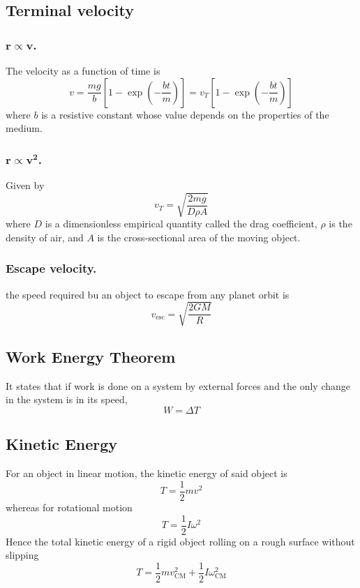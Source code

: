 \documentclass[../../../main.tex]{subfiles}
\begin{document}
\subsection*{Terminal velocity}
\subsubsection*{$\boldsymbol{r\propto v}$.} The velocity as a function of time is 
\begin{equation*}
    v=\frac{mg}{b}\left[1-\exp\left(-\frac{bt}{m}\right)\right]=v_T\left[1-\exp\left(-\frac{bt}{m}\right)\right]
\end{equation*}
where $b$ is a resistive constant whose value depends on the properties of the medium.
\subsubsection*{$\boldsymbol{r\propto v^2}$.} Given by 
\begin{equation*}
    v_T=\sqrt{\frac{2mg}{D\rho A}}
\end{equation*}
where $D$ is a dimensionless empirical quantity called the drag coefficient, $\rho$ is the density of air, and $A$ is the cross-sectional area of the moving object.

\subsubsection*{Escape velocity.} the speed required bu an object to escape from any planet orbit is 
\begin{equation*}
    v_\text{esc}=\sqrt{\frac{2GM}{R}}
\end{equation*}

\subsection*{Work Energy Theorem}
It states that if work is done on a system by external forces and
the only change in the system is in its speed,
\begin{equation*}
    W=\Delta T
\end{equation*}

\subsection*{Kinetic Energy}
For an object in linear motion, the kinetic energy of said object is 
\begin{equation*}
    T=\frac{1}{2}mv^2
\end{equation*}
whereas for rotational motion
\begin{equation*}
    T=\frac{1}{2}I\omega^2
\end{equation*}
Hence the total kinetic energy of a rigid object rolling on a rough surface without slipping
\begin{equation*}
    T=\frac{1}{2}mv_\text{CM}^2+\frac{1}{2}I\omega_\text{CM}^2
\end{equation*}
\end{document}
